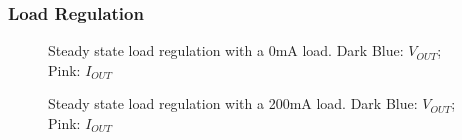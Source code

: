 \subsubsection{Load Regulation}
\label{sec:loadRegulation}
\begin{figure}[ht]
	\centering
	\caption{Steady state load regulation with a 0mA load. Dark Blue: $V_{OUT}$; Pink: $I_{OUT}$}
\end{figure}
\begin{figure}[ht]
	\centering
	\caption{Steady state load regulation with a 200mA load. Dark Blue: $V_{OUT}$; Pink: $I_{OUT}$}
\end{figure}
\clearpage



%    
